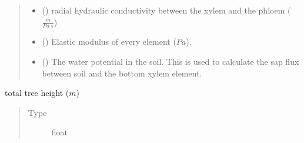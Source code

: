\documentclass[letterpaper,10pt,english]{sphinxmanual}
\begin{document}
\begin{fulllineitems}
\begin{quote}
\begin{description}
\begin{itemize}
\item {} 
 (\sphinxstyleliteralemphasis{\sphinxupquote{{[}}}\sphinxstyleliteralemphasis{\sphinxupquote{{]}}}\sphinxstyleliteralemphasis{\sphinxupquote{{]} or }}) \textendash{} radial hydraulic conductivity between the
xylem and the phloem (\(\frac{m}{Pa \: s}\))

\item {} 
 (\sphinxstyleliteralemphasis{\sphinxupquote{{[}}}\sphinxstyleliteralemphasis{\sphinxupquote{{[}}}\sphinxstyleliteralemphasis{\sphinxupquote{{]}}}\sphinxstyleliteralemphasis{\sphinxupquote{{]} or }}) \textendash{} Elastic modulus of every element (\(Pa\)).

\item {} 
 () \textendash{} The water potential in the soil. This is used to calculate the sap flux between
soil and the bottom xylem element.

\end{itemize}

\end{description}\end{quote}

\begin{fulllineitems}
\label{\detokenize{index:src.tree.Tree.height}}
total tree height (\(m\))
\begin{quote}\begin{description}
\item[{Type}] \leavevmode
float

\end{description}\end{quote}

\end{fulllineitems}



\end{fulllineitems}
\end{document}

